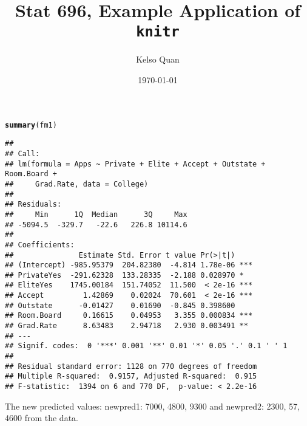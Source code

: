 \documentclass{article}\usepackage[]{graphicx}\usepackage[]{color}
\title{Stat 696, Example Application of \texttt{knitr}}
\author{Kelso Quan}
\date{\today}
\makeatletter
\newcommand{\hlstd}[1]{\textcolor[rgb]{0.345,0.345,0.345}{#1}}%
\newcommand{\hlkwd}[1]{\textcolor[rgb]{0.737,0.353,0.396}{\textbf{#1}}}%
\newenvironment{kframe}{%
 \def\at@end@of@kframe{}%
 \ifinner\ifhmode%
  \def\at@end@of@kframe{\end{minipage}}%
  \begin{minipage}{\columnwidth}%
 \fi\fi%
 \def\FrameCommand##1{\hskip\@totalleftmargin \hskip-\fboxsep
 \colorbox{shadecolor}{##1}\hskip-\fboxsep
     \hskip-\linewidth \hskip-\@totalleftmargin \hskip\columnwidth}%
 \MakeFramed {\advance\hsize-\width
   \@totalleftmargin\z@ \linewidth\hsize
   \@setminipage}}%
 {\par\unskip\endMakeFramed%
 \at@end@of@kframe}
\newenvironment{knitrout}{}{} %
\makeatother
\begin{document}
 
\maketitle





  




\begin{knitrout}
\color{fgcolor}\begin{kframe}
\begin{alltt}
\hlkwd{summary}\hlstd{(fm1)}
\end{alltt}
\begin{verbatim}
## 
## Call:
## lm(formula = Apps ~ Private + Elite + Accept + Outstate + Room.Board + 
##     Grad.Rate, data = College)
## 
## Residuals:
##     Min      1Q  Median      3Q     Max 
## -5094.5  -329.7   -22.6   226.8 10114.6 
## 
## Coefficients:
##               Estimate Std. Error t value Pr(>|t|)    
## (Intercept) -985.95379  204.82380  -4.814 1.78e-06 ***
## PrivateYes  -291.62328  133.28335  -2.188 0.028970 *  
## EliteYes    1745.00184  151.74052  11.500  < 2e-16 ***
## Accept         1.42869    0.02024  70.601  < 2e-16 ***
## Outstate      -0.01427    0.01690  -0.845 0.398600    
## Room.Board     0.16615    0.04953   3.355 0.000834 ***
## Grad.Rate      8.63483    2.94718   2.930 0.003491 ** 
## ---
## Signif. codes:  0 '***' 0.001 '**' 0.01 '*' 0.05 '.' 0.1 ' ' 1
## 
## Residual standard error: 1128 on 770 degrees of freedom
## Multiple R-squared:  0.9157,	Adjusted R-squared:  0.915 
## F-statistic:  1394 on 6 and 770 DF,  p-value: < 2.2e-16
\end{verbatim}
\end{kframe}
\end{knitrout}
The new predicted values: newpred1: 7000, 4800, 9300 and newpred2: 2300, 57, 4600 from the data.
\end{document}
